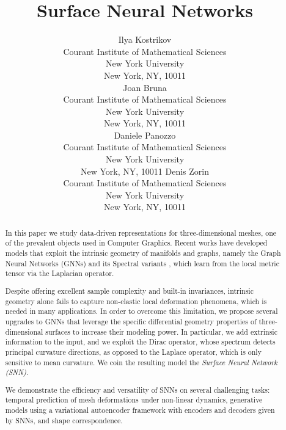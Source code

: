 \documentclass{article}
\title{Surface Neural Networks}
\author{
  Ilya Kostrikov \\
  Courant Institute of Mathematical Sciences\\
  New York University\\
  New York, NY, 10011 \\
 \And
    Joan Bruna \\
  Courant Institute of Mathematical Sciences\\
  New York University\\
  New York, NY, 10011 \\
 \And
    Daniele Panozzo \\
  Courant Institute of Mathematical Sciences\\
  New York University\\
  New York, NY, 10011 
\And
    Denis Zorin \\
  Courant Institute of Mathematical Sciences\\
  New York University\\
  New York, NY, 10011 
}
\begin{document}

\maketitle

\begin{abstract}
In this paper we study data-driven representations 
for three-dimensional meshes, one of the prevalent objects used in Computer Graphics. 
Recent works have developed models
that exploit the intrinsic geometry of manifolds and graphs, 
namely the Graph Neural Networks (GNNs) and its Spectral variants \cite{gnn1,gnn2}, 
which learn from the local metric tensor via the Laplacian operator. 

Despite offering excellent sample complexity and built-in invariances,
intrinsic geometry alone fails to capture non-elastic local deformation 
phenomena, which is needed in many applications. 
In order to overcome this limitation,
we propose several upgrades to GNNs 
that leverage the specific differential geometry properties 
 of three-dimensional surfaces 
 to increase their modeling power. 
 In particular, we add extrinsic information 
 to the input, and we exploit the Dirac operator, whose spectrum 
 detects principal curvature directions, as opposed to the Laplace 
 operator, which is only sensitive to mean curvature. We coin the 
 resulting model the \emph{Surface Neural Network (SNN)}.
 
 We demonstrate the efficiency and versatility of SNNs on 
 several challenging tasks: temporal prediction of mesh deformations
 under non-linear dynamics, generative models using 
 a variational autoencoder framework with encoders and decoders
 given by SNNs, and shape correspondence. 
 
\end{abstract}











\appendix





\end{document}
